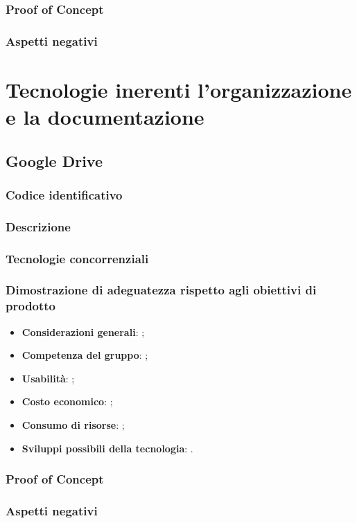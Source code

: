 \documentclass[./../Technology Baseline.tex]{subfiles}
\begin{document}
\subsubsection{Proof of Concept}
\subsubsection{Aspetti negativi}

\section{Tecnologie inerenti l'organizzazione e la documentazione}

\subsection{Google Drive}

\subsubsection{Codice identificativo}
\subsubsection{Descrizione}
\subsubsection{Tecnologie concorrenziali}
\subsubsection{Dimostrazione di adeguatezza rispetto agli obiettivi di prodotto}
\begin{itemize}
	\item \textbf{Considerazioni generali}: ;
	\item \textbf{Competenza del gruppo}: ;
	\item \textbf{Usabilità}: ;
	\item \textbf{Costo economico}: ;
	\item \textbf{Consumo di risorse}: ;
	\item \textbf{Sviluppi possibili della tecnologia}: .
\end{itemize}
\subsubsection{Proof of Concept}
\subsubsection{Aspetti negativi}
\end{document}
